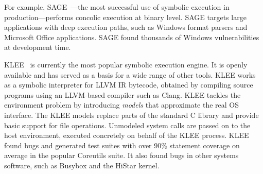 For example, SAGE~\cite{sage2012,godefroid:fuzz}---the most successful use of symbolic execution in production---performs concolic execution at binary level.
%
SAGE targets large applications with deep execution paths, such as Windows format parsers and Microsoft Office applications.
%
SAGE found thousands of Windows vulnerabilities at development time.



KLEE~\cite{klee} is currently the most popular symbolic execution engine.  It is openly available and has served as a basis for a wide range of other tools.
%
KLEE works as a symbolic interpreter for LLVM IR bytecode, obtained by compiling source programs using an LLVM-based compiler such as Clang.
%
KLEE tackles the environment problem by introducing \emph{models} that approximate the real OS interface.  The KLEE models replace parts of the standard C library and provide basic support for file operations.  Unmodeled system calls are passed on to the host environment, executed concretely on behalf of the KLEE process.
%
KLEE found bugs and generated test suites with over 90\% statement coverage on average in the popular Coreutils suite.  It also found bugs in other systems software, such as Busybox and the HiStar kernel.


